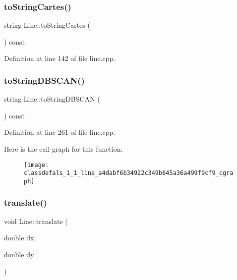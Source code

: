 \subsubsection{\texorpdfstring{to\+String\+Cartes()}{toStringCartes()}}
{\footnotesize\ttfamily string Line\+::to\+String\+Cartes (\begin{DoxyParamCaption}{ }\end{DoxyParamCaption}) const}



Definition at line 142 of file line.\+cpp.

\mbox{\label{classdefals_1_1_line_a4dabf6b34922c349b645a36a499f9cf9}} 
\subsubsection{\texorpdfstring{to\+String\+D\+B\+S\+C\+A\+N()}{toStringDBSCAN()}}
{\footnotesize\ttfamily string Line\+::to\+String\+D\+B\+S\+C\+AN (\begin{DoxyParamCaption}{ }\end{DoxyParamCaption}) const}



Definition at line 261 of file line.\+cpp.

Here is the call graph for this function\+:\nopagebreak
\begin{figure}[H]
\begin{center}
\leavevmode
\texttt{[image: classdefals\_1\_1\_line\_a4dabf6b34922c349b645a36a499f9cf9\_cgraph]}
\end{center}
\end{figure}
\mbox{\label{classdefals_1_1_line_afd9940c88b4d83aeaa9313d71fc93fdd}} 
\subsubsection{\texorpdfstring{translate()}{translate()}}
{\footnotesize\ttfamily void Line\+::translate (\begin{DoxyParamCaption}\item[{double}]{dx,  }\item[{double}]{dy }\end{DoxyParamCaption})}




